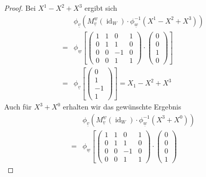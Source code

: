 \documentclass{article}
\newcommand{\id}{\operatorname{id}}
\begin{document}
\begin{enumerate}[(a)]
\begin{enumerate}[1.)]
\begin{proof}
            Bei $X^1 - X^2 + X^3$ ergibt sich
            \begin{align*}
                &\phi_{\underline{v}}(M_{\underline{v}}^{\underline{w}} (\id_W) \cdot \phi_{\underline{w}}^{-1}(X^1 - X^2 + X^3))\\
                =&\phi_{\underline{w}}
                    \left[
                    \begin{pmatrix}
                        1 & 1 & 0 & 1\\
                        0 & 1 & 1 & 0\\
                        0 & 0 & -1 & 0\\
                        0 & 0 & 1 & 1
                    \end{pmatrix} \cdot 
                    \begin{pmatrix}0 \\ 0 \\ 1 \\ 0\end{pmatrix}
                    \right]\\
                =&\phi_{\underline{v}}
                    \left[\begin{pmatrix}0\\ 1\\ -1\\ 1\end{pmatrix}\right]
                    = X_1 - X^2 + X^3
            \end{align*}
            Auch für $X^3 + X^0$ erhalten wir das gewünschte Ergebnis
            \begin{align*}
                &\phi_{\underline{v}}(M_{\underline{v}}^{\underline{w}} (\id_W) \cdot \phi_{\underline{w}}^{-1}(X^3 + X^0))\\
                =&\phi_{\underline{w}}
                    \left[
                    \begin{pmatrix}
                        1 & 1 & 0 & 1\\
                        0 & 1 & 1 & 0\\
                        0 & 0 & -1 & 0\\
                        0 & 0 & 1 & 1
                    \end{pmatrix} \cdot 
                    \begin{pmatrix}0 \\ 0 \\ 0 \\ 1\end{pmatrix}

\end{align*}
\end{proof}
\end{enumerate}
\end{enumerate}
\end{document}
